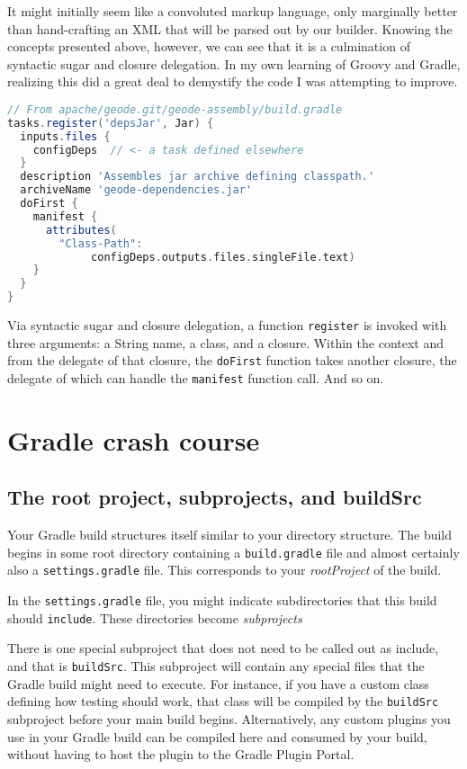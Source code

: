 \documentclass[]{article}
\theoremstyle{definition}
\newcommand{\startSnippetFig}{%
\begin{snippet}[t]
  \begin{minipage}[c]{.6\textwidth}
    \begin{framed}
}
\newcommand{\stopSnippetFig}{%
    \end{framed}
  \end{minipage}
\end{snippet}
}
\begin{document}
It might initially seem like a convoluted markup language,
  only marginally better than hand-crafting an XML that will be parsed out by our builder.
Knowing the concepts presented above, however, we can see that it is a culmination of
  syntactic sugar and closure delegation.
In my own learning of Groovy and Gradle, realizing this did a great deal to demystify the
  code I was attempting to improve.

\startSnippetFig
  \begin{lstlisting}[language=Groovy]
// From apache/geode.git/geode-assembly/build.gradle
tasks.register('depsJar', Jar) {
  inputs.files {
    configDeps  // <- a task defined elsewhere
  }
  description 'Assembles jar archive defining classpath.'
  archiveName 'geode-dependencies.jar'
  doFirst {
    manifest {
      attributes(
        "Class-Path":
             configDeps.outputs.files.singleFile.text)
    }
  }
}
  \end{lstlisting}
  \caption{Via syntactic sugar and closure delegation,
  a function \texttt{register} is invoked with three arguments: a String name, a class, and a closure.
  Within the context and from the delegate of that closure,
    the \texttt{doFirst} function takes another closure,
    the delegate of which can handle the \texttt{manifest} function call.
  And so on.}
  \label{snip:keywords}
\stopSnippetFig

\section{Gradle crash course}

\subsection{The root project, subprojects, and buildSrc}

Your Gradle build structures itself similar to your directory structure.
The build begins in some root directory containing a \texttt{build.gradle} file and almost certainly also a \texttt{settings.gradle} file.
This corresponds to your \emph{rootProject} of the build.

In the \texttt{settings.gradle} file, you might indicate subdirectories that this build should \texttt{include}.
These directories become \emph{subprojects}

There is one special subproject that does not need to be called out as include, and that is \texttt{buildSrc}.
This subproject will contain any special files that the Gradle build might need to execute.
For instance, if you have a custom class defining how testing should work, that class will be compiled by the \texttt{buildSrc} subproject before your main build begins.
Alternatively, any custom plugins you use in your Gradle build can be compiled here and consumed by your build, without having to host the plugin to the Gradle Plugin Portal.
\end{document}
